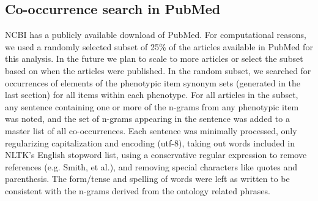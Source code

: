 \documentclass{sig-alternate-05-2015}
\begin{document}

\subsection{Co-occurrence search in PubMed}

NCBI has a publicly available download of PubMed.
For computational reasons, we used a randomly selected subset of 25\% of the articles available in PubMed for this analysis. 
In the future we plan to scale to more articles or select the subset based on when the articles were published.
In the random subset, we searched for occurrences of elements of the phenotypic item synonym sets (generated in the last section) for all items within each phenotype.
For all articles in the subset, any sentence containing one or more of the n-grams from any phenotypic item was noted, and the set of n-grams appearing in the sentence was added to a master list of all co-occurrences. 
Each sentence was minimally processed, only regularizing capitalization and encoding (utf-8), taking out words included in NLTK's English stopword list, using a conservative regular expression to remove references (e.g. Smith, et al.), and removing special characters like quotes and parenthesis. 
The form/tense and spelling of words were left as written to be consistent with the n-grams derived from the ontology related phrases.
\end{document}
